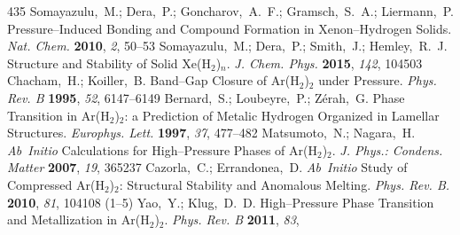 \documentclass[12pt,letterpaper,oneside]{article}
\begin{document}
\begin{mcitethebibliography}{435}
Somayazulu,~M.; Dera,~P.; Goncharov,~A.~F.; Gramsch,~S.~A.; Liermann,~P.
    Pressure--Induced Bonding and Compound Formation in
  Xenon--Hydrogen Solids. \emph{Nat. Chem.} \textbf{2010}, \emph{2},
  50--53\relax
\mciteBstWouldAddEndPuncttrue
\mciteSetBstMidEndSepPunct{\mcitedefaultmidpunct}
{\mcitedefaultendpunct}{\mcitedefaultseppunct}\relax
\EndOfBibitem
{}
Somayazulu,~M.; Dera,~P.; Smith,~J.; Hemley,~R.~J. Structure and Stability of
  Solid Xe(H$_{2}$)$_{n}$. \emph{J. Chem. Phys.} \textbf{2015}, \emph{142},
  104503\relax
\mciteBstWouldAddEndPuncttrue
\mciteSetBstMidEndSepPunct{\mcitedefaultmidpunct}
{\mcitedefaultendpunct}{\mcitedefaultseppunct}\relax
\EndOfBibitem
{}
Chacham,~H.; Koiller,~B. Band--Gap Closure of Ar(H$_2$)$_2$ under Pressure.
  \emph{Phys. Rev. B} \textbf{1995}, \emph{52}, 6147--6149\relax
\mciteBstWouldAddEndPuncttrue
\mciteSetBstMidEndSepPunct{\mcitedefaultmidpunct}
{\mcitedefaultendpunct}{\mcitedefaultseppunct}\relax
\EndOfBibitem
{}
Bernard,~S.; Loubeyre,~P.; Z{\'e}rah,~G. Phase Transition in Ar(H$_2$)$_2$: a
  Prediction of Metalic Hydrogen Organized in Lamellar Structures.
  \emph{Europhys. Lett.} \textbf{1997}, \emph{37}, 477--482\relax
\mciteBstWouldAddEndPuncttrue
\mciteSetBstMidEndSepPunct{\mcitedefaultmidpunct}
{\mcitedefaultendpunct}{\mcitedefaultseppunct}\relax
\EndOfBibitem
{}
Matsumoto,~N.; Nagara,~H. \emph{Ab~Initio} Calculations for High--Pressure Phases of
  Ar(H$_2$)$_2$. \emph{J. Phys.: Condens. Matter} \textbf{2007}, \emph{19},
  365237\relax
\mciteBstWouldAddEndPuncttrue
\mciteSetBstMidEndSepPunct{\mcitedefaultmidpunct}
{\mcitedefaultendpunct}{\mcitedefaultseppunct}\relax
\EndOfBibitem
{}
Cazorla,~C.; Errandonea,~D. \emph{Ab~Initio} Study of Compressed Ar(H$_{2}$)$_{2}$:
  Structural Stability and Anomalous Melting. \emph{Phys. Rev. B.}
  \textbf{2010}, \emph{81}, 104108 (1--5)\relax
\mciteBstWouldAddEndPuncttrue
\mciteSetBstMidEndSepPunct{\mcitedefaultmidpunct}
{\mcitedefaultendpunct}{\mcitedefaultseppunct}\relax
\EndOfBibitem
{}
Yao,~Y.; Klug,~D.~D. High--Pressure Phase Transition and Metallization in
  Ar(H$_{2}$)$_{2}$. \emph{Phys. Rev. B} \textbf{2011}, \emph{83},

\end{mcitethebibliography}
\end{document}
